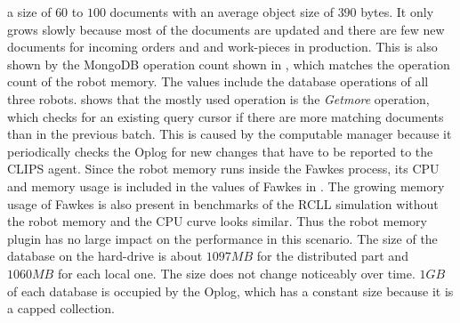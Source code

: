 a size of $60$ to $100$ documents with an average object size of $390$
bytes. It only grows slowly because most of the documents are updated
and there are few new documents for incoming orders and and work-pieces
in production. This is also shown by the MongoDB operation count shown
in , which matches the operation count of
the robot memory. The values include the database operations of
all three robots.  shows that the mostly
used operation is the \emph{Getmore} operation, which checks for an
existing query cursor if there are more matching documents than in the
previous batch. This is caused by the computable manager because it
periodically checks the Oplog for new changes that have to be reported
to the CLIPS agent. Since the robot memory runs inside the Fawkes
process, its CPU and memory usage is included in the values of Fawkes
in . The growing memory usage of Fawkes is
also present in benchmarks of the RCLL simulation without the robot
memory and the CPU curve looks similar. Thus the robot memory plugin
has no large impact on the performance in this scenario. 
The size of the database on the hard-drive is about $1097MB$ for the
distributed part and $1060MB$ for each local one. The size does not
change noticeably over time. $1GB$ of each database is occupied by the
Oplog, which has a constant size because it is a capped collection.

